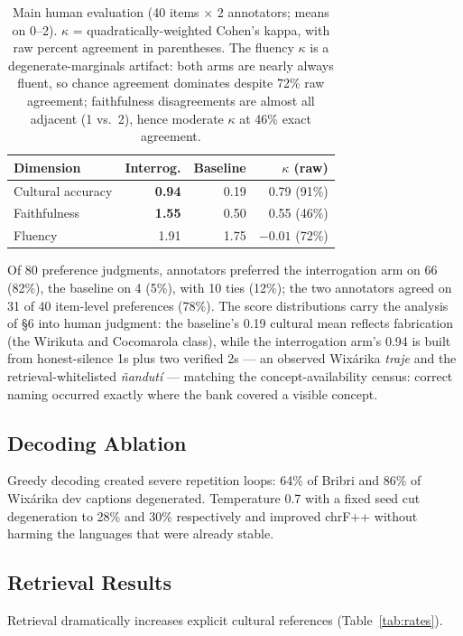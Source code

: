 \documentclass[11pt]{article}
\begin{document}
\begin{table}[h]
\centering
\small
\begin{tabular}{lrrr}
\toprule
Dimension & Interrog. & Baseline & $\kappa$ (raw) \\
\midrule
Cultural accuracy & \textbf{0.94} & 0.19 & 0.79 (91\%) \\
Faithfulness      & \textbf{1.55} & 0.50 & 0.55 (46\%) \\
Fluency           & 1.91 & 1.75 & $-0.01$ (72\%) \\
\bottomrule
\end{tabular}
\caption{Main human evaluation (40 items $\times$ 2 annotators; means on
0--2). $\kappa$ = quadratically-weighted Cohen's kappa, with raw percent
agreement in parentheses. The fluency $\kappa$ is a degenerate-marginals
artifact: both arms are nearly always fluent, so chance agreement dominates
despite 72\% raw agreement; faithfulness disagreements are almost all
adjacent (1 vs.\ 2), hence moderate $\kappa$ at 46\% exact agreement.}
\label{tab:human4}
\end{table}

Of 80 preference judgments, annotators preferred the interrogation arm on
66 (82\%), the baseline on 4 (5\%), with 10 ties (12\%); the two annotators
agreed on 31 of 40 item-level preferences (78\%). The score distributions
carry the analysis of \S6 into human judgment: the baseline's 0.19 cultural
mean reflects fabrication (the Wirikuta and Cocomarola class), while the
interrogation arm's 0.94 is built from honest-silence 1s plus two verified
2s --- an observed Wixárika \emph{traje} and the retrieval-whitelisted
\emph{ñandutí} --- matching the concept-availability census: correct
naming occurred exactly where the bank covered a visible concept.

\subsection{Decoding Ablation}
Greedy decoding created severe repetition loops: 64\% of Bribri and 86\% of
Wixárika dev captions degenerated. Temperature 0.7 with a fixed seed cut
degeneration to 28\% and 30\% respectively and improved chrF++ without
harming the languages that were already stable.

\subsection{Retrieval Results}
Retrieval dramatically increases explicit cultural references
(Table~\ref{tab:rates}).
\end{document}
